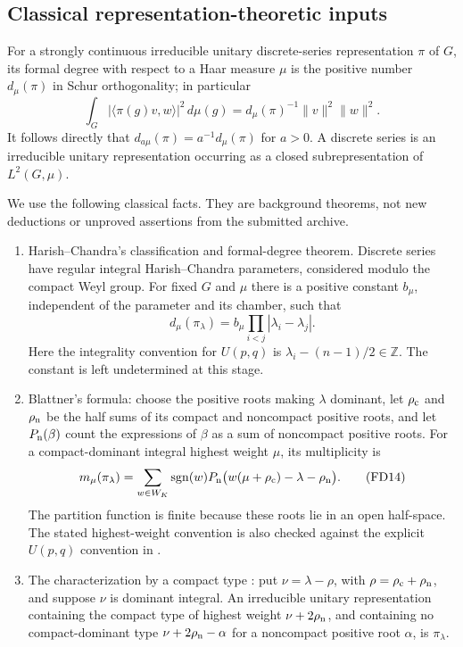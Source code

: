 \subsection{Classical representation-theoretic inputs}

For a strongly continuous irreducible unitary discrete-series
representation $\pi$ of $G$, its formal degree with respect to
a Haar measure $\mu$ is the positive number $d_\mu(\pi)$ in
Schur orthogonality; in particular
\[
  \int_G|\langle\pi(g)v,w\rangle|^2\,d\mu(g)
      =d_\mu(\pi)^{-1}\|v\|^2\|w\|^2.
 \tag{FD12}
\]
It follows directly that
$d_{a\mu}(\pi)=a^{-1}d_\mu(\pi)$ for $a>0$.
A discrete series is an irreducible unitary representation
occurring as a closed subrepresentation of $L^2(G,\mu)$.

We use the following classical facts. They are background
theorems, not new deductions or unproved assertions from
the submitted archive.

\begin{enumerate}
\item Harish--Chandra's classification and formal-degree theorem.
Discrete series have regular integral Harish--Chandra parameters,
considered modulo the compact Weyl group.
For fixed $G$ and $\mu$ there is a positive constant $b_\mu$,
independent of the parameter and its chamber, such that
\[
                    d_\mu(\pi_\lambda)
                       =b_\mu\prod_{i<j}|\lambda_i-\lambda_j|.
 \tag{FD13}\label{fd-classical-hc}
\]
Here the integrality convention for $U(p,q)$ is
$\lambda_i-(n-1)/2\in\mathbb Z$.
The constant is left undetermined at this stage.
\cite[Theorem 16, \S41]{harish-chandra-ds-ii}
\item Blattner's formula: choose the positive roots making
$\lambda$ dominant, let $\rho_{\rm c}$ and $\rho_{\rm n}$
be the half sums of its compact and noncompact positive
roots, and let $P_{\rm n}(\beta)$ count the expressions of
$\beta$ as a sum of noncompact positive roots. For a
compact-dominant integral highest weight $\mu$, its
multiplicity is
\[
 m_\mu(\pi_\lambda)=
  \sum_{w\in W_K}\operatorname{sgn}(w)
       P_{\rm n}\bigl(w(\mu+\rho_{\rm c})
                                -\lambda-\rho_{\rm n}\bigr).
 \tag{FD14}\label{fd-blattner}
\]
The partition function is finite because these roots lie
in an open half-space.
\cite[III.1, theorem (2)]{duflo-heckman-vergne}
The stated highest-weight convention is also checked
against the explicit $U(p,q)$ convention in
\cite[\S2.2]{baldoni-vergne}.
\item The characterization by a compact type
\cite[Theorem 1.1]{parthasarathy-minimal}:
put $\nu=\lambda-\rho$, with $\rho=\rho_{\rm c}+\rho_{\rm n}$,
and suppose $\nu$ is dominant integral. An irreducible
unitary representation containing the compact type of
highest weight $\nu+2\rho_{\rm n}$, and containing no
compact-dominant type $\nu+2\rho_{\rm n}-\alpha$ for a
noncompact positive root $\alpha$, is $\pi_\lambda$.
\end{enumerate}

